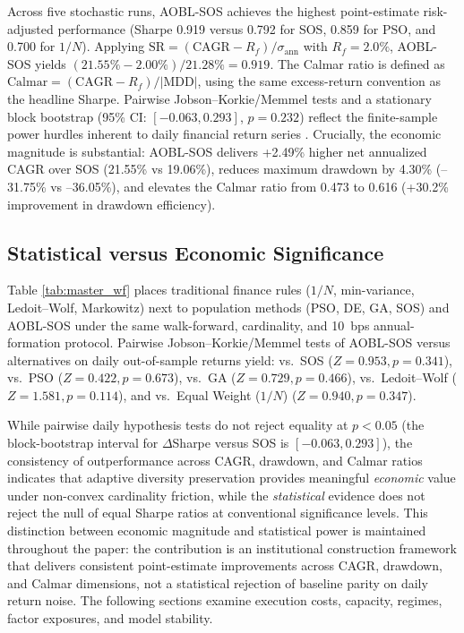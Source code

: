 \documentclass[11pt,a4paper]{article}
\begin{document}
Across five stochastic runs, AOBL-SOS achieves the highest point-estimate risk-adjusted performance (Sharpe 0.919 versus 0.792 for SOS, 0.859 for PSO, and 0.700 for $1/N$). Applying $\text{SR} = (\text{CAGR} - R_f)/\sigma_{\text{ann}}$ with $R_f = 2.0\%$, AOBL-SOS yields $(21.55\% - 2.00\%)/21.28\% = 0.919$. The Calmar ratio is defined as $\text{Calmar} = (\text{CAGR} - R_f) / |\text{MDD}|$, using the same excess-return convention as the headline Sharpe. Pairwise Jobson--Korkie/Memmel tests \cite{jobson1981, memmel2003} and a stationary block bootstrap (95\% CI: $[-0.063, 0.293]$, $p=0.232$) reflect the finite-sample power hurdles inherent to daily financial return series \cite{bailey2014}. Crucially, the economic magnitude is substantial: AOBL-SOS delivers +2.49\% higher net annualized CAGR over SOS (21.55\% vs 19.06\%), reduces maximum drawdown by 4.30\% (--31.75\% vs --36.05\%), and elevates the Calmar ratio from 0.473 to 0.616 (+30.2\% improvement in drawdown efficiency).

\subsection{Statistical versus Economic Significance}
\label{sec:stat_econ}
Table \ref{tab:master_wf} places traditional finance rules ($1/N$, min-variance, Ledoit--Wolf, Markowitz) next to population methods (PSO, DE, GA, SOS) and AOBL-SOS under the same walk-forward, cardinality, and 10~bps annual-formation protocol. Pairwise Jobson--Korkie/Memmel tests \cite{jobson1981, memmel2003} of AOBL-SOS versus alternatives on daily out-of-sample returns yield: vs.~SOS ($Z = 0.953, p = 0.341$), vs.~PSO ($Z = 0.422, p = 0.673$), vs.~GA ($Z = 0.729, p = 0.466$), vs.~Ledoit--Wolf ($Z = 1.581, p = 0.114$), and vs.~Equal Weight ($1/N$) ($Z = 0.940, p = 0.347$).

While pairwise daily hypothesis tests do not reject equality at $p < 0.05$ (the block-bootstrap interval for $\Delta$Sharpe versus SOS is $[-0.063, 0.293]$), the consistency of outperformance across CAGR, drawdown, and Calmar ratios indicates that adaptive diversity preservation provides meaningful \emph{economic} value under non-convex cardinality friction, while the \emph{statistical} evidence does not reject the null of equal Sharpe ratios at conventional significance levels. This distinction between economic magnitude and statistical power is maintained throughout the paper: the contribution is an institutional construction framework that delivers consistent point-estimate improvements across CAGR, drawdown, and Calmar dimensions, not a statistical rejection of baseline parity on daily return noise. The following sections examine execution costs, capacity, regimes, factor exposures, and model stability.
\end{document}
